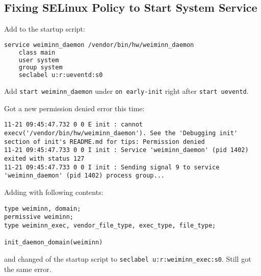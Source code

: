 \subsection{Fixing SELinux Policy to Start System Service}
\label{task:20231121_aosp}


Add  to the startup script:
\begin{lstlisting}[language=sh]
service weiminn_daemon /vendor/bin/hw/weiminn_daemon
    class main
    user system
    group system
    seclabel u:r:ueventd:s0
\end{lstlisting}
Add \texttt{start weiminn\_daemon} under \texttt{on early-init} right after \texttt{start ueventd}.

Got a new permission denied error this time:
\begin{lstlisting}
11-21 09:45:47.732 0 0 E init : cannot execv('/vendor/bin/hw/weiminn_daemon'). See the 'Debugging init' section of init's README.md for tips: Permission denied
11-21 09:45:47.733 0 0 I init : Service 'weiminn_daemon' (pid 1402) exited with status 127
11-21 09:45:47.733 0 0 I init : Sending signal 9 to service 'weiminn_daemon' (pid 1402) process group...    
\end{lstlisting}

Adding  with following contents:
\begin{lstlisting}
type weiminn, domain; 
permissive weiminn;
type weiminn_exec, vendor_file_type, exec_type, file_type; 

init_daemon_domain(weiminn)     
\end{lstlisting}
and changed  of the startup script to \texttt{seclabel u:r:weiminn\_exec:s0}. Still got the same error.